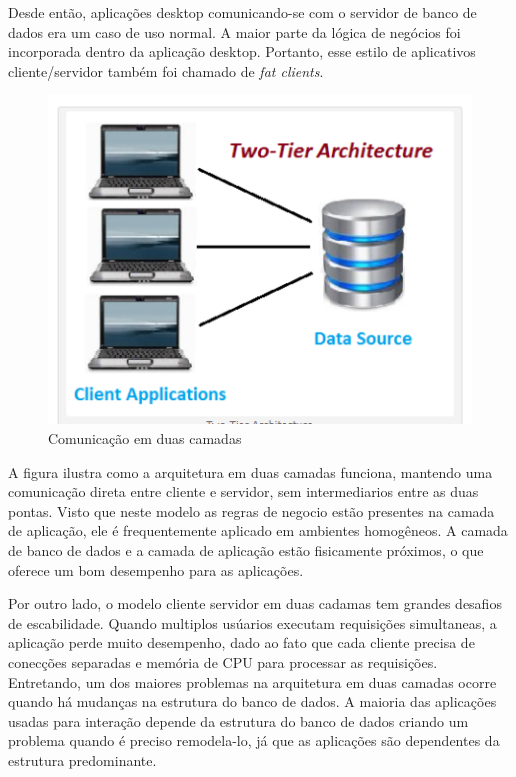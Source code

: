 Desde então, aplicações desktop comunicando-se com o servidor de banco de dados era um caso de uso normal. A maior parte da lógica de negócios foi incorporada dentro da aplicação desktop. Portanto, esse estilo de aplicativos cliente/servidor também foi chamado de \textit{fat clients}. 

\begin{figure}[ht]
    \centering
    \includegraphics[width=1\textwidth]{figuras/two-tier.png}
    \caption{Comunicação em duas camadas}
    \label{fig:two-tier}
\end{figure}

A figura \cite{fig:two-tier} ilustra como a arquitetura em duas camadas funciona, mantendo uma comunicação direta entre cliente e servidor, sem intermediarios entre as duas pontas. Visto que neste modelo as regras de negocio estão presentes na camada de aplicação, ele é frequentemente aplicado em ambientes homogêneos. A camada de banco de dados e a camada de aplicação estão fisicamente próximos, o que oferece um bom desempenho para as aplicações.

Por outro lado, o modelo cliente servidor em duas cadamas tem grandes desafios de escabilidade. Quando multiplos usúarios executam requisições simultaneas, a aplicação perde muito desempenho, dado ao fato que cada cliente precisa de conecções separadas e memória de CPU para processar as requisições. Entretando, um dos maiores problemas na arquitetura em duas camadas ocorre quando há mudanças na estrutura do banco de dados. A maioria das aplicações usadas para interação depende da estrutura do banco de dados criando um problema quando é preciso remodela-lo, já que as aplicações são dependentes da estrutura predominante.

